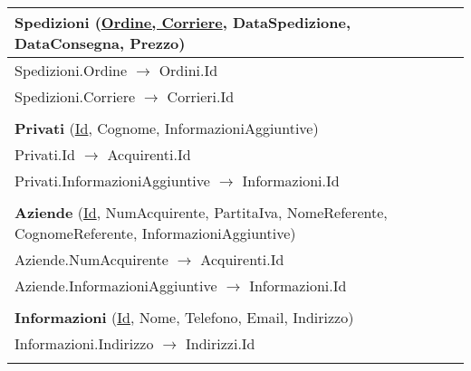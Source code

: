 \begin{center}
\begin{minipage}[t]{7.5cm}
{\begin{tabular}{P{7.5cm}}
				 \textbf{Spedizioni} (\underline{Ordine, Corriere}, DataSpedizione, DataConsegna, Prezzo)                              \\
				\midrule
				Spedizioni.Ordine $\to$ Ordini.Id                                                                                                                      \\
				\midrule
				Spedizioni.Corriere $\to$ Corrieri.Id                                                                                                                  \\                                \\
				\midrule

				 \textbf{Privati} (\underline{Id}, Cognome, InformazioniAggiuntive)                                                    \\
				\midrule
				Privati.Id $\to$ Acquirenti.Id                                                                                                                         \\
				\midrule
				Privati.InformazioniAggiuntive $\to$ Informazioni.Id                                                                                                   \\                                \\
				\midrule

				 \textbf{Aziende} (\underline{Id}, NumAcquirente, PartitaIva, NomeReferente, CognomeReferente, InformazioniAggiuntive) \\
				\midrule
				Aziende.NumAcquirente $\to$ Acquirenti.Id                                                                                                              \\
				\midrule
				Aziende.InformazioniAggiuntive $\to$ Informazioni.Id                                                                                                   \\                                \\
				\midrule

				 \textbf{Informazioni} (\underline{Id}, Nome, Telefono, Email, Indirizzo)                                                    \\
				\midrule
				Informazioni.Indirizzo $\to$ Indirizzi.Id                                                                                                                \\                                \\
				\midrule


\end{tabular}}
\end{minipage}
\end{center}
